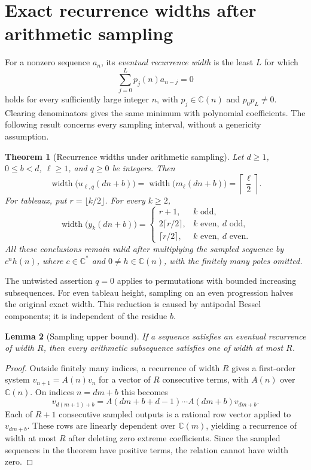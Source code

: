 \documentclass[11pt,a4paper]{article}
\newtheorem{theorem}{Theorem}[section]
\newtheorem{lemma}[theorem]{Lemma}
\theoremstyle{definition}
\theoremstyle{remark}
\newcommand{\C}{\mathbb C}
\numberwithin{equation}{section}
\begin{document}
\section{Exact recurrence widths after arithmetic sampling}
\label{B:up:subsequence-section}

For a nonzero sequence $a_n$, its \emph{eventual recurrence width} is
the least $L$ for which
\[
 \sum_{j=0}^{L}p_j(n)a_{n-j}=0
\]
holds for every sufficiently large integer $n$, with
$p_j\in\C(n)$ and $p_0p_L\ne0$.  Clearing denominators gives the
same minimum with polynomial coefficients.  The following result
concerns every sampling interval, without a genericity assumption.

\begin{theorem}[Recurrence widths under arithmetic sampling]
\label{B:up:sample-order}
Let $d\ge1$, $0\le b<d$, $\ell\ge1$, and $q\ge0$ be integers.
Then
\[
 \operatorname{width}\bigl(u_{\ell,q}(dn+b)\bigr)
 =\operatorname{width}\bigl(m_\ell(dn+b)\bigr)
 =\left\lceil\frac\ell2\right\rceil.
\]
For tableaux, put $r=\lfloor k/2\rfloor$.  For every $k\ge2$,
\[
 \operatorname{width}\bigl(y_k(dn+b)\bigr)=
 \begin{cases}
 r+1,&k\text{ odd},\\
 2\lceil r/2\rceil,&k\text{ even},\ d\text{ odd},\\
 \lceil r/2\rceil,&k\text{ even},\ d\text{ even}.
 \end{cases}
\]
All these conclusions remain valid after multiplying the sampled
sequence by $c^n h(n)$, where $c\in\C^*$ and
$0\ne h\in\C(n)$, with the finitely many poles omitted.
\end{theorem}

The untwisted assertion $q=0$ applies to permutations with bounded
increasing subsequences.  For even tableau height, sampling on an even
progression halves the original exact width.  This reduction is caused
by antipodal Bessel components; it is independent of the residue $b$.

\begin{lemma}[Sampling upper bound]\label{B:up:sample-upper}
If a sequence satisfies an eventual recurrence of width $R$, then
every arithmetic subsequence satisfies one of width at most $R$.
\end{lemma}
\begin{proof}
Outside finitely many indices, a recurrence of width $R$ gives a
first-order system $v_{n+1}=A(n)v_n$ for a vector of $R$ consecutive
terms, with $A(n)$ over $\C(n)$.  On indices $n=dm+b$ this becomes
\[
 v_{d(m+1)+b}
 =A(dm+b+d-1)\cdots A(dm+b)v_{dm+b}.
\]
Each of $R+1$ consecutive sampled outputs is a rational row vector
applied to $v_{dm+b}$.  These rows are linearly dependent over
$\C(m)$, yielding a recurrence of width at most $R$ after deleting
zero extreme coefficients.  Since the sampled sequences in the
theorem have positive terms, the relation cannot have width zero.
\end{proof}
\end{document}
